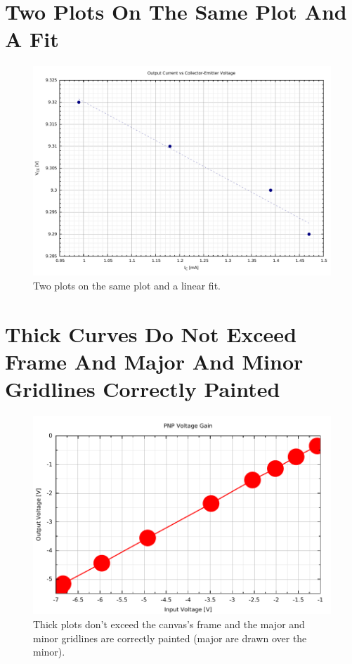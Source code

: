 \documentclass[10pt,a4paper,final]{report}
\begin{document}
\section{Two Plots On The Same Plot And A Fit}
\begin{figure}[!hbtp]
\centering
\includegraphics[width=\textwidth]{../CodeJeanLuc/OutputResistanceQ2/OutputResistanceQ2.pdf}
\caption{Two plots on the same plot and a linear fit.}
\end{figure}


\section{Thick Curves Do Not Exceed Frame And Major And Minor Gridlines Correctly Painted}
\begin{figure}[!hbtp]
\centering
\includegraphics[width=\textwidth]{../CodeJeanLuc/ElectronicCircuitsLab3/ElectronicCircuitsLab3.pdf}
\caption{Thick plots don't exceed the canvas's frame and the major and minor gridlines are correctly painted (major are drawn over the minor).}
\end{figure}

\end{document}
